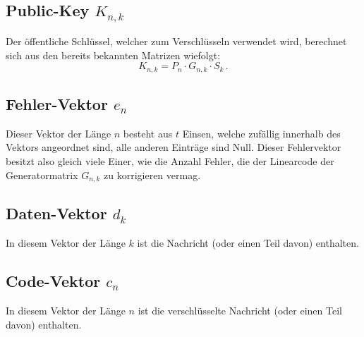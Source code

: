\subsection{Public-Key $K_{n,k}$
\label{mceliece:subsection:k_nk}}
Der öffentliche Schlüssel, welcher zum Verschlüsseln verwendet wird,
berechnet sich aus den bereits bekannten Matrizen wiefolgt:
\[
    K_{n,k}=P_{n}\cdot G_{n,k}\cdot S_{k}\,.
\]

\subsection{Fehler-Vektor $e_n$
\label{mceliece:subsection:e_n}}
Dieser Vektor der Länge $n$ besteht aus $t$ Einsen, welche zufällig innerhalb des Vektors angeordnet sind,
alle anderen Einträge sind Null.
Dieser Fehlervektor besitzt also gleich viele Einer,
wie die Anzahl Fehler, die der Linearcode der Generatormatrix $G_{n,k}$ zu korrigieren vermag.

\subsection{Daten-Vektor $d_k$
\label{mceliece:subsection:d_k}}
In diesem Vektor der Länge $k$ ist die Nachricht (oder einen Teil davon) enthalten.

\subsection{Code-Vektor $c_n$
\label{mceliece:subsection:c_n}}
In diesem Vektor der Länge $n$ ist die verschlüsselte Nachricht (oder einen Teil davon) enthalten.